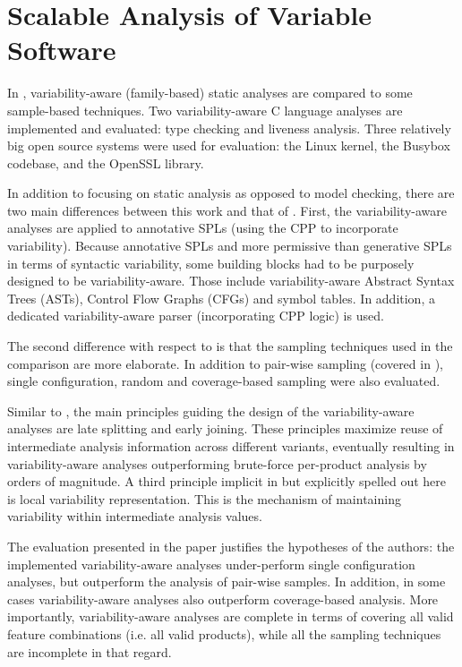 \documentclass[11pt]{article}
\begin{document}
\section{Scalable Analysis of Variable Software}
In \cite{Liebig:2013}, variability-aware (family-based) static analyses are compared to some sample-based techniques. Two variability-aware C language analyses are implemented and evaluated: type checking and liveness analysis. Three relatively big open source systems were used for evaluation: the Linux kernel, the Busybox codebase, and the OpenSSL library.

In addition to focusing on static analysis as opposed to model checking, there are two main differences between this work and that of \cite{Apel:2013}. First, the variability-aware analyses are applied to annotative SPLs (using the CPP to incorporate variability). Because annotative SPLs and more permissive than generative SPLs in terms of syntactic variability, some building blocks had to be purposely designed to be variability-aware. Those include variability-aware Abstract Syntax Trees (ASTs), Control Flow Graphs (CFGs) and symbol tables. In addition, a dedicated variability-aware parser (incorporating CPP logic) is used.

The second difference with respect to \cite{Apel:2013} is that the sampling techniques used in the comparison are more elaborate. In addition to pair-wise sampling (covered in \cite{Apel:2013}), single configuration, random and coverage-based sampling were also evaluated.

Similar to \cite{Apel:2013}, the main principles guiding the design of the variability-aware analyses are late splitting and early joining. These principles maximize reuse of intermediate analysis information across different variants, eventually resulting in variability-aware analyses outperforming brute-force per-product analysis by orders of magnitude. A third principle implicit in \cite{Apel:2013} but explicitly spelled out here is local variability representation. This is the mechanism of maintaining variability within intermediate analysis values.

The evaluation presented in the paper justifies the hypotheses of the authors: the implemented variability-aware analyses under-perform single configuration analyses, but outperform the analysis of pair-wise samples. In addition, in some cases variability-aware analyses also outperform coverage-based analysis. More importantly, variability-aware analyses are complete in terms of covering all valid feature combinations (i.e. all valid products), while all the sampling techniques are incomplete in that regard.
\end{document}

